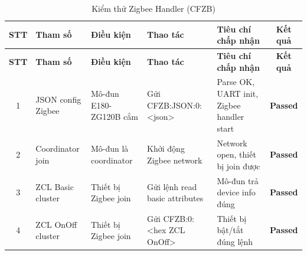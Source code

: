         \begin{longtable}{|c|p{2cm}|p{2.5cm}|p{3.5cm}|p{4cm}|c|}
            \caption{Kiểm thử Zigbee Handler (CFZB)}
            \label{tab:test_zigbee_handler} \\
            \hline
            \textbf{STT} & \textbf{Tham số} & \textbf{Điều kiện} & \textbf{Thao tác} & \textbf{Tiêu chí chấp nhận} & \textbf{Kết quả} \\ \hline
            \endfirsthead
            \hline
            \textbf{STT} & \textbf{Tham số} & \textbf{Điều kiện} & \textbf{Thao tác} & \textbf{Tiêu chí chấp nhận} & \textbf{Kết quả} \\ \hline
            \endhead
            \hline
            \endfoot
            \endlastfoot
        
            1 & JSON config Zigbee & Mô-đun E180-ZG120B cắm & Gửi CFZB:JSON:0:\newline<json> & Parse OK, UART init, Zigbee handler start & \textcolor{modern_blue}{\textbf{Passed}} \\ \hline
            2 & Coordinator join & Mô-đun là coordinator & Khởi động Zigbee network & Network open, thiết bị join được & \textcolor{modern_blue}{\textbf{Passed}} \\ \hline
            3 & ZCL Basic cluster & Thiết bị Zigbee join & Gửi lệnh read basic attributes & Mô-đun trả device info đúng & \textcolor{modern_blue}{\textbf{Passed}} \\ \hline
            4 & ZCL OnOff cluster & Thiết bị Zigbee join & Gửi CFZB:0:<hex ZCL OnOff> & Thiết bị bật/tắt đúng lệnh & \textcolor{modern_blue}{\textbf{Passed}} \\ \hline
        \end{longtable}
        
